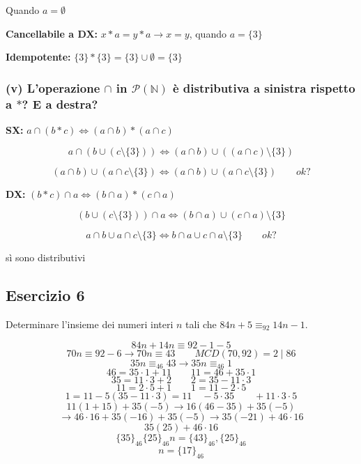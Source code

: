 Quando $a = \emptyset$

\textbf{Cancellabile a DX:} $x * a = y * a \to x = y$, quando $a = \{3\}$

\textbf{Idempotente:} $\{3\} * \{3\} = \{3\} \cup \emptyset = \{3\}$

\subsubsection*{(v) L'operazione $\cap$ in $\mathcal{P}(\mathbb{N})$ è distributiva a sinistra rispetto a $*$? E a destra?}

\textbf{SX:} $a \cap (b * c) \Leftrightarrow (a \cap b) * (a \cap c)$

$$a \cap (b \cup (c \setminus \{3\})) \Leftrightarrow (a \cap b) \cup ((a \cap c) \setminus \{3\})$$

$$(a \cap b) \cup (a \cap c \setminus \{3\}) \Leftrightarrow (a \cap b) \cup (a \cap c \setminus \{3\}) \qquad ok?$$

\textbf{DX:} $(b * c) \cap a \Leftrightarrow (b \cap a) * (c \cap a)$

$$(b \cup (c \setminus \{3\})) \cap a \Leftrightarrow (b \cap a) \cup (c \cap a) \setminus \{3\}$$

$$a \cap b \cup a \cap c \setminus \{3\} \Leftrightarrow b \cap a \cup c \cap a \setminus \{3\} \qquad ok?$$

sì sono distributivi

\subsection*{Esercizio 6}

Determinare l'insieme dei numeri interi $n$ tali che $84n + 5 \equiv_{92} 14n - 1$.

$$84n + 14n \equiv 92 - 1 - 5$$
$$70n \equiv 92 - 6 \longrightarrow 70n \equiv 43 \qquad MCD(70, 92) = 2 \mid 86$$
$$35n \equiv_{46} 43 \longrightarrow 35n \equiv_{46} 1$$
$$46 = 35 \cdot 1 + 11 \qquad 11 = 46 + 35 \cdot 1$$
$$35 = 11 \cdot 3 + 2 \qquad 2 = 35 - 11 \cdot 3$$
$$11 = 2 \cdot 5 + 1 \qquad 1 = 11 - 2 \cdot 5$$
$$1 = 11 - 5(35 - 11 \cdot 3) = 11 \quad -5 \cdot 35 \qquad +11 \cdot 3 \cdot 5$$
$$11(1 + 15) + 35(-5) \longrightarrow 16(46 - 35) + 35(-5)$$
$$\longrightarrow 46 \cdot 16 + 35(-16) + 35(-5) \longrightarrow 35(-21) + 46 \cdot 16$$
$$35(25) + 46 \cdot 16$$
$$\{35\}_{46} \{25\}_{46} n = \{43\}_{46}, \{25\}_{46}$$
$$n = \{17\}_{46}$$

